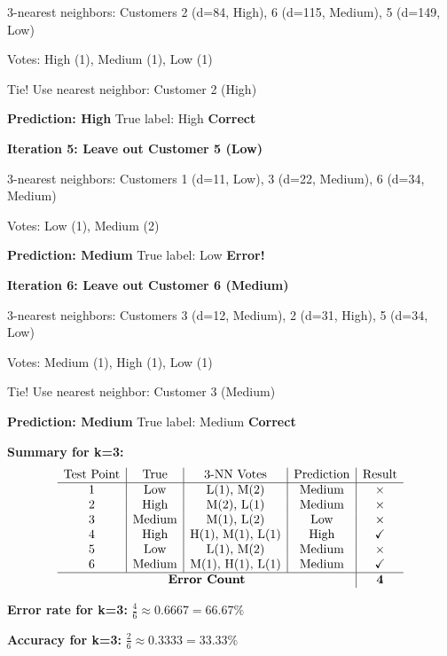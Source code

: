 \documentclass[12pt]{article}
\begin{document}
\begin{solution}
3-nearest neighbors: Customers 2 (d=84, High), 6 (d=115, Medium), 5 (d=149, Low)

Votes: High (1), Medium (1), Low (1)

Tie! Use nearest neighbor: Customer 2 (High)

\textbf{Prediction: High} \quad True label: High \quad \checkmark \textbf{Correct}

\textbf{Iteration 5: Leave out Customer 5 (Low)}

3-nearest neighbors: Customers 1 (d=11, Low), 3 (d=22, Medium), 6 (d=34, Medium)

Votes: Low (1), Medium (2)

\textbf{Prediction: Medium} \quad True label: Low \quad \textbf{Error!}

\textbf{Iteration 6: Leave out Customer 6 (Medium)}

3-nearest neighbors: Customers 3 (d=12, Medium), 2 (d=31, High), 5 (d=34, Low)

Votes: Medium (1), High (1), Low (1)

Tie! Use nearest neighbor: Customer 3 (Medium)

\textbf{Prediction: Medium} \quad True label: Medium \quad \checkmark \textbf{Correct}

\textbf{Summary for k=3:}
\[
\begin{array}{c|c|c|c|c}
\text{Test Point} & \text{True} & \text{3-NN Votes} & \text{Prediction} & \text{Result} \\
\hline
1 & \text{Low} & \text{L(1), M(2)} & \text{Medium} & \times \\
2 & \text{High} & \text{M(2), L(1)} & \text{Medium} & \times \\
3 & \text{Medium} & \text{M(1), L(2)} & \text{Low} & \times \\
4 & \text{High} & \text{H(1), M(1), L(1)} & \text{High} & \checkmark \\
5 & \text{Low} & \text{L(1), M(2)} & \text{Medium} & \times \\
6 & \text{Medium} & \text{M(1), H(1), L(1)} & \text{Medium} & \checkmark \\
\hline
\multicolumn{4}{c|}{\textbf{Error Count}} & \mathbf{4} \\
\end{array}
\]

\textbf{Error rate for k=3:} \(\boxed{\frac{4}{6} \approx 0.6667 = 66.67\%}\)

\textbf{Accuracy for k=3:} \(\boxed{\frac{2}{6} \approx 0.3333 = 33.33\%}\)


\end{solution}
\end{document}
